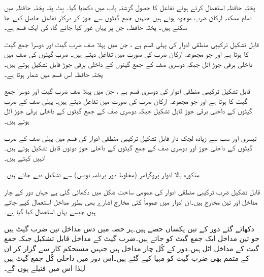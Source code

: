 پختہ حافظہ استعمال کرتے ہوئے تفاعل کا حصول گزشتہ باب میں دکھایا گیا۔  بِٹ پتہ  پختہ حافظہ میں تمام ممکنہ    ارکان ضرب موجود ہوتے ہیں جنہیں جمع گیٹوں سے جوڑ کر درکار تفاعل حاصل کیے  جا سکتے ہیں۔ پختہ حافظہ، جن پر یہاں غور کیا جائے گا،  کی  ایک  قسم ہے۔

قابل تشکیل ترکیبی منطقی ادوار کی پہلی قسم    ہے  ، جن میں پہلا  صف ضرب گیٹ اور دوسرا   جمع گیٹ  کا ہوتا ہے اور  جو مجموعہ ارکان ضرب کی صورت  میں تفاعل دیتے ہیں۔  ضرب گیٹوں  کی صف میں داخلی برقی جوڑ اٹل  جبکہ دوسری صف کے جمع گیٹوں کے داخلی برقی جوڑ قابل تشکیل ہوتے ہیں۔پختہ حافظہ  اس قسم میں شمار ہوتا ہے۔

قابل تشکیل ترکیبی منطقی ادوار کی دوسری قسم      ہے  ، جن میں پہلا  صف ضرب گیٹ اور دوسرا   جمع گیٹ  کا ہوتا ہے اور  جو مجموعہ ارکان ضرب کی صورت  میں تفاعل دیتے ہیں۔  پہلی صف کے ضرب گیٹوں کے داخلی برقی جوڑ  قابل تشکیل جبکہ  دوسری صف کے جمع گیٹوں کے داخلی برقی جوڑ اٹل ہوتے ہیں۔

تیسری اور سب سے زیادہ  لچک دار قابل تشکیل ترکیبی منطقی ادوار کی قسم میں پہلی صف کے ضرب گیٹوں کے داخلی جوڑ اور دوسری صف کے جمع گیٹوں کے داخلی جوڑ  دونوں قابل تشکیل ہوتے ہیں۔انہیں کہتے ہیں۔

مذکورہ  بالا ادوار   پروگرامر (مخلوط دور برنامہ نویس)   سے تشکیل دیے جاتے ہیں۔


قابل تشکیل ضرب  ترکیبی منطقی ادوار کی عمومی ساخت شکل  میں دکھائی گئی ہے جہاں دور کے چار مداخل اور تین مخارج ہیں۔ان ادوار میں عموماً کئی مخارج اشارے  بھی  بطور مداخل   استعمال کیے جاتے ہیں  جیسے  یہاں    استعمال کیا گیا  ہے۔

دکھائے گئے  دور کے تین یکساں حصے ہیں۔ہر حصہ میں دس     مداخل  تین ضرب گیٹ ہیں جو  تین مداخل ایک جمع گیٹ کو جاتے ہیں۔ضرب گیٹ کے مداخل قابل تشکیل جبکہ جمع گیٹ کے مداخل اٹل ہیں۔دور کے کُل چار مداخل ہیں جنہیں مستحکم کار سے گزار کر ان  کے  متمم بھی  ضرب گیٹ کو مہیا کیے گئے ہیں۔اس دور میں   داخلی کُل جمع گیٹ ہیں لہٰذا  اس میں   فتیلے ہوں گے۔

